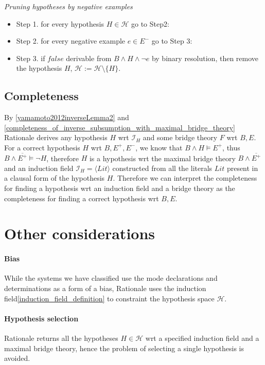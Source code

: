 \begin{algorithm}\emph{Pruning hypotheses by negative examples}
\begin{itemize}
\item Step 1. for every hypothesis $H \in \mathcal{H}$ go to Step2:
\item Step 2. for every negative example $e \in E^-$ go to Step 3:
\item Step 3. if $false$ derivable from $B \land H \land \neg e$ by binary resolution, then remove the hypothesis $H$, $\mathcal{H}:=\mathcal{H} \setminus \{H\}$.
\end{itemize}
\end{algorithm}

\subsection{Completeness}
By \ref{yamamoto2012inverseLemma2} and \ref{completeness_of_inverse_subsumption_with_maximal_bridge_theory} Rationale derives any hypothesis $H$ wrt $\mathcal{I}_H$ and some bridge theory $F$ wrt $B, E$. For a correct hypothesis $H$ wrt $B, E^+, E^-$, we know that $B \land H \models E^+$, thus $B \land \overline{E^+} \models \neg H$, therefore $H$ is a hypothesis wrt the maximal bridge theory $B \land \overline{E^+}$ and an induction field $\mathcal{I}_H=\langle Lit \rangle$ constructed from all the literals $Lit$ present in a clausal form of the hypothesis $H$. Therefore we can interpret the completeness for finding a hypothesis wrt an induction field and a bridge theory as the completeness for finding a correct hypothesis wrt $B, E$.

\section{Other considerations}
\paragraph{Bias}
While the systems we have classified use the mode declarations and determinations as a form of a bias, Rationale uses the induction field\ref{induction_field_definition} to constraint the hypothesis space $\mathcal{H}$.

\paragraph{Hypothesis selection}
Rationale returns all the hypotheses $H \in \mathcal{H}$ wrt a specified induction field and a maximal bridge theory, hence the problem of selecting a single hypothesis is avoided.

